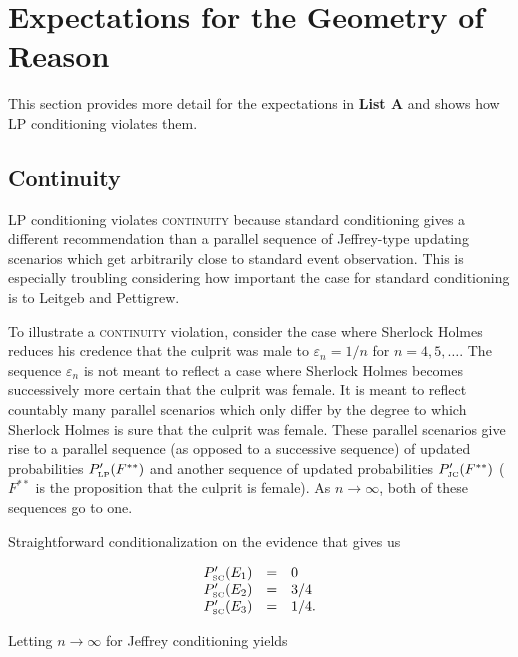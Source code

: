 \documentclass[11pt]{article}
\begin{document}
\section{Expectations for the Geometry of Reason}
\label{fivex}

This section provides more detail for the expectations in \textbf{List
  A} and shows how LP conditioning violates them.

\subsection{Continuity}
\label{Continuity}

LP conditioning violates \textsc{continuity} because standard
conditioning gives a different recommendation than a parallel sequence
of Jeffrey-type updating scenarios which get arbitrarily close to
standard event observation. This is especially troubling considering
how important the case for standard conditioning is to Leitgeb and
Pettigrew.

To illustrate a \textsc{continuity} violation, consider the case where
Sherlock Holmes reduces his credence that the culprit was male to
$\varepsilon_{n}=1/n$ for $n=4,5,\ldots$. The sequence
$\varepsilon_{n}$ is not meant to reflect a case where Sherlock Holmes
becomes successively more certain that the culprit was female. It is
meant to reflect countably many parallel scenarios which only differ
by the degree to which Sherlock Holmes is sure that the culprit was
female. These parallel scenarios give rise to a parallel sequence (as
opposed to a successive sequence) of updated probabilities
$P'_{\mbox{\tiny LP}}(F^{**})$ and another sequence of updated
probabilities $P'_{\mbox{\tiny JC}}(F^{**})$ ($F^{**}$ is the
proposition that the culprit is female). As $n\rightarrow\infty$, both
of these sequences go to one.

Straightforward conditionalization on the evidence that  gives us 

\begin{equation}
  \label{eq:sherlockcontsc}
  \begin{array}{rcl}
  P'_{\mbox{\tiny SC}}(E_{1})&=&0\\
  P'_{\mbox{\tiny SC}}(E_{2})&=&3/4\\
  P'_{\mbox{\tiny SC}}(E_{3})&=&1/4.
\end{array}
\end{equation}

Letting $n\rightarrow\infty$ for Jeffrey conditioning yields
\end{document}
